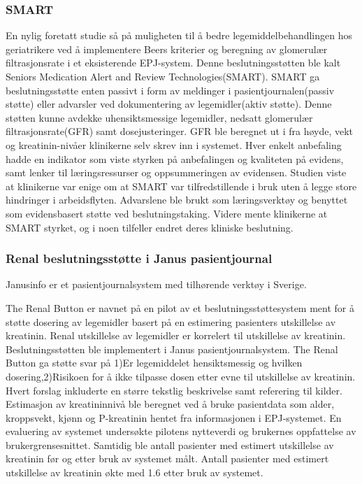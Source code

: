 \subsubsection{SMART}
En nylig foretatt studie så på muligheten til å bedre legemiddelbehandlingen hos geriatrikere ved å implementere Beers kriterier og beregning av glomerulær filtrasjonsrate i et eksisterende EPJ-system\citep{SMART}. Denne beslutningsstøtten ble kalt Seniors Medication Alert and Review Technologies(SMART). SMART ga beslutningsstøtte enten passivt i form av meldinger i pasientjournalen(passiv støtte) eller advarsler ved dokumentering av legemidler(aktiv støtte). Denne støtten kunne avdekke uhensiktsmessige legemidler, nedsatt glomerulær filtrasjonsrate(GFR) samt dosejusteringer. GFR ble beregnet ut i fra høyde, vekt og kreatinin-nivåer klinikerne selv skrev inn i systemet. Hver enkelt anbefaling hadde en indikator som viste styrken på anbefalingen og  kvaliteten på evidens, samt lenker til læringsressurser og oppsummeringen av evidensen. Studien viste at klinikerne var enige om at SMART var tilfredstillende i bruk uten å legge store hindringer i arbeidsflyten. Advarslene ble brukt som læringsverktøy og benyttet som evidensbasert støtte ved beslutningstaking. Videre mente klinikerne at SMART styrket, og i noen tilfeller endret deres kliniske beslutning.
\subsubsection{Renal beslutningsstøtte i Janus pasientjournal}
Janusinfo er et pasientjournalsystem med tilhørende verktøy i Sverige.

The Renal Button er navnet på en pilot av et beslutningsstøttesystem ment for å støtte dosering av legemidler basert på en estimering pasienters utskillelse av kreatinin\citep{Hellden_Al-Aieshy_2015}. Renal utskillelse av legemidler er korrelert til utskillelse av kreatinin. Beslutningsstøtten ble implementert i Janus pasientjournalsystem. The Renal Button ga støtte svar på 1)Er legemiddelet hensiktsmessig og hvilken dosering,2)Risikoen for å ikke tilpasse dosen etter evne til utskillelse av kreatinin. Hvert forslag inkluderte en større tekstlig beskrivelse samt referering til kilder. Estimasjon av kreatininnivå ble beregnet ved å bruke pasientdata som alder, kroppsvekt, kjønn og P-kreatinin hentet fra informasjonen i EPJ-systemet. En evaluering av systemet undersøkte pilotens nytteverdi og brukernes oppfattelse av brukergrensesnittet. Samtidig ble antall pasienter med estimert utskillelse av kreatinin før og etter bruk av systemet målt. Antall pasienter med estimert utskillelse av kreatinin økte med 1.6 etter bruk av systemet.

